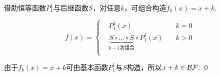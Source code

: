 \begin{pf} \rm 
    借助恒等函数$P_1^1$与后继函数$S$，对任意$k$，可组合构造$f_k(x)=x+k$.

    $$ f(x)=\left\{
        \begin{aligned}
        &P_1^1(x)   & k=0 \\
        &\underbrace{S\circ \dots \circ S}_{k-1次组合} \circ P_1^1(x) \quad & k>0 \\
        \end{aligned}
    \right.
    $$

    由于$f_k(x) = x+k$可由基本函数$P_1^1$与$S$构造，所以$x+k\in\mathcal{BF}$.
    \qed
\end{pf}